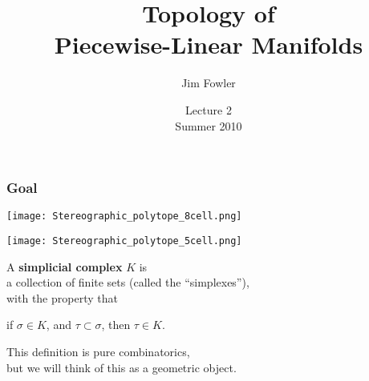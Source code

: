 \documentclass[14pt]{beamer}
\title{Topology of  \\ Piecewise-Linear Manifolds}
\author{Jim Fowler}
\date{Lecture 2 \\ Summer 2010}
\begin{document}
\begin{frame}
\maketitle
\end{frame}

\begin{frame}
\frametitle{Goal}

\begin{center}
\scalebox{4}{Definitions?}
\end{center}

\end{frame}

\begin{frame}
\begin{center}
\vspace{-1ex}
\texttt{[image: Stereographic\_polytope\_8cell.png]}
\end{center}
\end{frame}

\begin{frame}
\begin{center}
\texttt{[image: Stereographic\_polytope\_5cell.png]}
\end{center}
\end{frame}

\begin{frame}
  A \textbf{simplicial complex} $K$ is \\
  a collection of finite sets (called the ``simplexes''), \\
  with the property that \\
  \begin{center}
  if $\sigma \in K$, and $\tau \subset \sigma$, \quad then $\tau \in K$.
  \end{center}

  \vfill
  \pause
  
  This definition is pure combinatorics, \\
  but we will think of this as a geometric object.

\end{frame}
\end{document}
